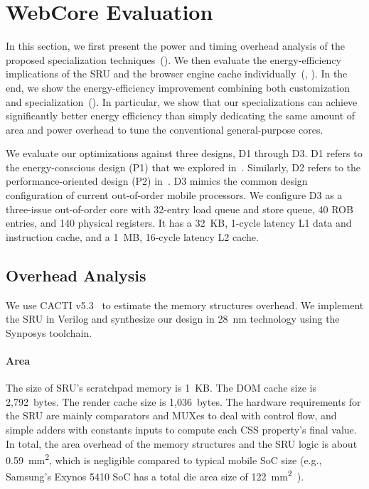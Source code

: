 \section{WebCore Evaluation}
\label{sec:arch:eval}

In this section, we first present the power and timing overhead analysis of the proposed specialization techniques~(). We then evaluate the energy-efficiency implications of the SRU and the browser engine cache individually~(, ). In the end, we show the energy-efficiency improvement combining both customization and specialization~(). In particular, we show that our specializations can achieve significantly better energy efficiency than simply dedicating the same amount of area and power overhead to tune the conventional general-purpose cores.

We evaluate our optimizations against three designs, D1 through D3. D1 refers to the energy-conscious design (P1) that we explored in~. Similarly, D2 refers to the performance-oriented design (P2) in~. D3 mimics the common design configuration of current out-of-order mobile processors. We configure D3 as a three-issue out-of-order core with 32-entry load queue and store queue, 40 ROB entries, and 140 physical registers. It has a 32~KB, 1-cycle latency L1 data and instruction cache, and a 1~MB, 16-cycle latency L2 cache.

\subsection{Overhead Analysis}
\label{sec:arch:eval:oh}

We use CACTI v5.3~\cite{cacti} to estimate the memory structures overhead. We implement the SRU in Verilog and synthesize our design in 28~nm technology using the Synposys toolchain.

\paragraph{Area} The size of SRU's scratchpad memory is 1~KB. The DOM cache size is 2,792~bytes. The render cache size is 1,036~bytes. The hardware requirements for the SRU are mainly comparators and MUXes to deal with control flow, and simple adders with constants inputs to compute each CSS property's final value. In total, the area overhead of the memory structures and the SRU logic is about 0.59~mm\textsuperscript{2}, which is negligible compared to typical mobile SoC size (e.g., Samsung's Exynos 5410 SoC has a total die area size of 122~mm\textsuperscript{2}~\cite{exynox5410diesize}).

